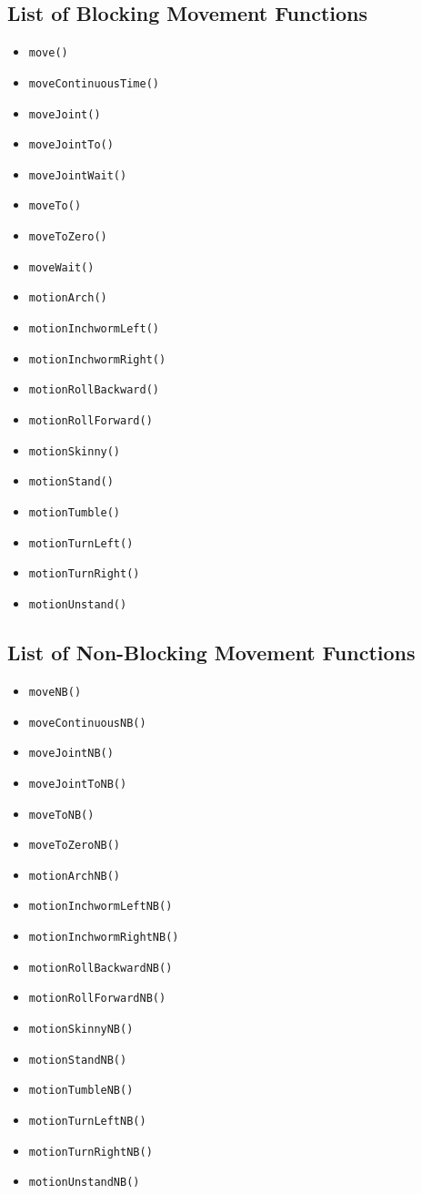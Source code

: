 \documentclass{article}
\begin{document}
\subsection{List of Blocking Movement Functions}
\begin{itemize}
\item \texttt{move()}
\item \texttt{moveContinuousTime()}
\item \texttt{moveJoint()}
\item \texttt{moveJointTo()}
\item \texttt{moveJointWait()}
\item \texttt{moveTo()}
\item \texttt{moveToZero()}
\item \texttt{moveWait()}
\item \texttt{motionArch()}
\item \texttt{motionInchwormLeft()}
\item \texttt{motionInchwormRight()}
\item \texttt{motionRollBackward()}
\item \texttt{motionRollForward()}
\item \texttt{motionSkinny()}
\item \texttt{motionStand()}
\item \texttt{motionTumble()}
\item \texttt{motionTurnLeft()}
\item \texttt{motionTurnRight()}
\item \texttt{motionUnstand()}
\end{itemize}

\subsection{List of Non-Blocking Movement Functions}
\begin{itemize}
\item \texttt{moveNB()}
\item \texttt{moveContinuousNB()}
\item \texttt{moveJointNB()}
\item \texttt{moveJointToNB()}
\item \texttt{moveToNB()}
\item \texttt{moveToZeroNB()}
\item \texttt{motionArchNB()}
\item \texttt{motionInchwormLeftNB()}
\item \texttt{motionInchwormRightNB()}
\item \texttt{motionRollBackwardNB()}
\item \texttt{motionRollForwardNB()}
\item \texttt{motionSkinnyNB()}
\item \texttt{motionStandNB()}
\item \texttt{motionTumbleNB()}
\item \texttt{motionTurnLeftNB()}
\item \texttt{motionTurnRightNB()}
\item \texttt{motionUnstandNB()}
\end{itemize}
\end{document}
